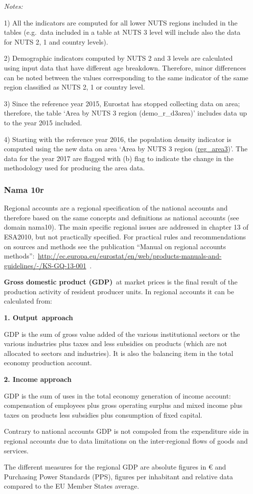 \documentclass[
  letterpaper,
  DIV=11,
  numbers=noendperiod]{scrartcl}
\begin{document}
\emph{Notes:}

1) All the indicators are computed for all lower NUTS regions included
in the tables (e.g.~data included in a table at NUTS 3 level will
include also the data for NUTS 2, 1 and country levels).

2) Demographic indicators computed by NUTS 2 and 3 levels are calculated
using input data that have different age breakdown. Therefore, minor
differences can be noted between the values corresponding to the same
indicator of the same region classified as NUTS 2, 1 or country level.

3) Since the reference year 2015, Eurostat has stopped collecting data
on area; therefore, the table `Area by NUTS 3 region (demo\_r\_d3area)'
includes data up to the year 2015 included.

4) Starting with the reference year 2016, the population density
indicator is computed using the new data on area `Area by NUTS 3 region
(\href{http://appsso.eurostat.ec.europa.eu/nui/show.do?dataset=reg_area3\&lang=en}{reg\_area3})'.
The data for the year 2017 are flagged with (b) flag to indicate the
change in the methodology used for producing the area data.

\hypertarget{nama-10r}{%
\subsubsection{Nama 10r}\label{nama-10r}}

Regional accounts are a regional specification of the national accounts
and therefore based on the same concepts and definitions as national
accounts (see domain nama10). The main specific regional issues are
addressed in chapter 13 of ESA2010, but not practically specified. For
practical rules and recommendations on sources and methods see the
publication ``Manual on regional accounts
methods'':~\url{http://ec.europa.eu/eurostat/en/web/products-manuals-and-guidelines/-/KS-GQ-13-001}~.

\textbf{Gross domestic product (GDP)}~at market prices is the final
result of the production activity of resident producer units. In
regional accounts it can be calculated from:

\textbf{1. Output~approach}

GDP is the sum of gross value added of the various institutional sectors
or the various industries plus taxes and less subsidies on products
(which are not allocated to sectors and industries). It is also the
balancing item in the total economy production account.

\textbf{2. Income approach}

GDP is the sum of uses in the total economy generation of income
account: compensation of employees plus gross operating surplus and
mixed income plus taxes on products less subsidies plus consumption of
fixed capital.

Contrary to national accounts GDP is not compoled from the expenditure
side in regional accounts due to data limitations on the inter-regional
flows of goods and services.

The different measures for the regional GDP are absolute figures in €
and Purchasing Power Standards (PPS), figures per inhabitant and
relative data compared to the EU Member States average.
\end{document}
